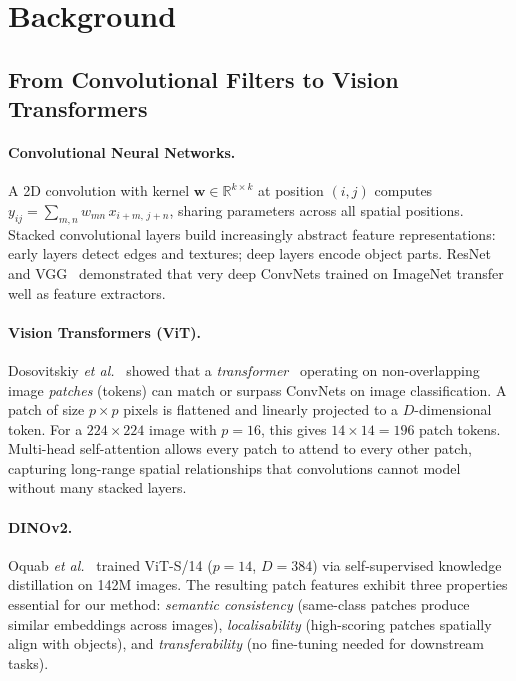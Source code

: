 \documentclass[10pt,twocolumn,letterpaper]{article}
\begin{document}
\section{Background}
\label{sec:background}

\subsection{From Convolutional Filters to Vision Transformers}

\paragraph{Convolutional Neural Networks.}
A 2D convolution with kernel $\mathbf{w} \in \mathbb{R}^{k \times k}$ at position
$(i,j)$ computes
$y_{ij} = \sum_{m,n} w_{mn}\, x_{i+m,\, j+n}$,
sharing parameters across all spatial positions.
Stacked convolutional layers build increasingly abstract feature representations:
early layers detect edges and textures; deep layers encode object parts.
ResNet~\cite{he2016deep} and VGG~\cite{simonyan2015very} demonstrated that
very deep ConvNets trained on ImageNet transfer well as feature extractors.

\paragraph{Vision Transformers (ViT).}
Dosovitskiy \emph{et al.}~\cite{dosovitskiy2021image} showed that a
\emph{transformer}~\cite{vaswani2017attention} operating on non-overlapping
image \emph{patches} (tokens) can match or surpass ConvNets on image classification.
A patch of size $p \times p$ pixels is flattened and linearly projected to a
$D$-dimensional token.
For a $224 \times 224$ image with $p=16$, this gives $14 \times 14 = 196$ patch
tokens.
Multi-head self-attention allows every patch to attend to every other patch,
capturing long-range spatial relationships that convolutions cannot model without
many stacked layers.

\paragraph{DINOv2.}
Oquab \emph{et al.}~\cite{oquab2023dinov2} trained ViT-S/14 ($p=14$,
$D=384$) via self-supervised knowledge distillation on 142M images.
The resulting patch features exhibit three properties essential for our method:
\emph{semantic consistency} (same-class patches produce similar embeddings
across images), \emph{localisability} (high-scoring patches spatially align with
objects), and \emph{transferability} (no fine-tuning needed for downstream tasks).
\end{document}
